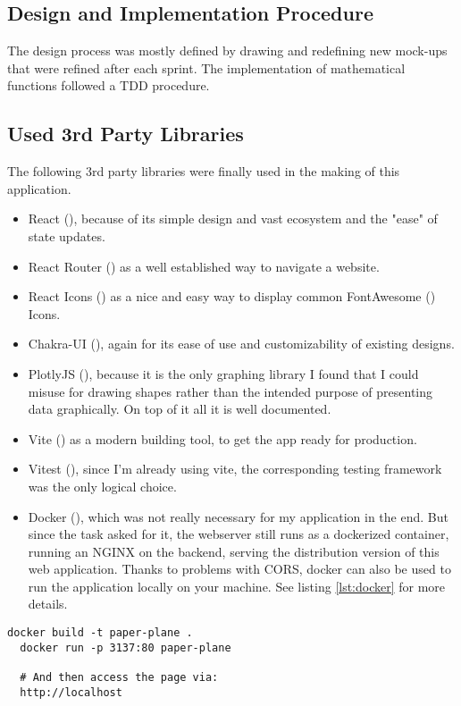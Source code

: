 \blankpage
\newpage
\subsection{Design and Implementation Procedure}
The design process was mostly defined by drawing and redefining new mock-ups that were refined after each sprint. The implementation of mathematical functions followed a \ac{TDD} procedure.

\subsection{Used 3rd Party Libraries}
The following 3rd party libraries were finally used in the making of this application.
\begin{itemize}
  \item React (\cite{React}), because of its simple design and vast ecosystem and the "ease" of state updates.
  \item React Router (\cite{ReactRouter}) as a well established way to navigate a website. 
  \item React Icons (\cite{ReactIcons}) as a nice and easy way to display common FontAwesome (\cite{FA}) Icons.
  \item Chakra-UI (\cite{chakra}), again for its ease of use and customizability of existing designs.
  \item PlotlyJS (\cite{PlotlyJS}), because it is the only graphing library I found that I could misuse for drawing shapes rather than the intended purpose of presenting data graphically. On top of it all it is well documented.
  \item Vite (\cite{Vite}) as a modern building tool, to get the app ready for production.
  \item Vitest (\cite{Vitest}), since I'm already using vite, the corresponding testing framework was the only logical choice.
  \item Docker (\cite{Docker}), which was not really necessary for my application in the end. But since the task asked for it, the webserver still runs as a dockerized container, running an NGINX \cite{NGINX} on the backend, serving the distribution version of this web application. Thanks to problems with \acs{CORS}, docker can also be used to run the application locally on your machine. See listing \ref{lst:docker} for more details.
\end{itemize}

\begin{lstlisting}[label=lst:docker]
  docker build -t paper-plane .
  docker run -p 3137:80 paper-plane

  # And then access the page via:
  http://localhost
\end{lstlisting}